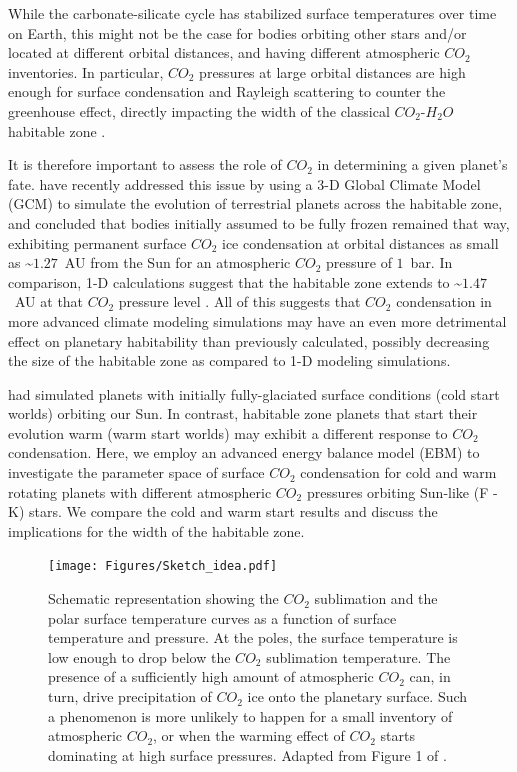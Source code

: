 \documentclass[fleqn,usenatbib]{mnras}
\providecommand{\DIFdelbegin}{} %
\providecommand{\DIFdelend}{} %
\newcommand{\DIFscaledelfig}{0.5}
\newlength{\DIFdelgraphicswidth} %
\newlength{\DIFdelgraphicsheight} %
\newcommand{\DIFdelincludegraphics}[2][]{%
\sbox{\DIFdelgraphicsbox}{\DIFOincludegraphics[#1]{#2}}%
\settoboxwidth{\DIFdelgraphicswidth}{\DIFdelgraphicsbox} %
\settoboxtotalheight{\DIFdelgraphicsheight}{\DIFdelgraphicsbox} %
\scalebox{\DIFscaledelfig}{%
\parbox[b]{\DIFdelgraphicswidth}{\usebox{\DIFdelgraphicsbox}\\[-\baselineskip] \rule{\DIFdelgraphicswidth}{0em}}\llap{\resizebox{\DIFdelgraphicswidth}{\DIFdelgraphicsheight}{%
\setlength{\unitlength}{\DIFdelgraphicswidth}%
\begin{picture}(1,1)%
\thicklines\linethickness{2pt} %
{\color[rgb]{1,0,0}\put(0,0){\framebox(1,1){}}}%
{\color[rgb]{1,0,0}\put(0,0){\line( 1,1){1}}}%
{\color[rgb]{1,0,0}\put(0,1){\line(1,-1){1}}}%
\end{picture}%
}\hspace*{3pt}}} %
} %
\DeclareRobustCommand{\DIFdelbegin}{\DIFOdelbegin \let\includegraphics\DIFdelincludegraphics} %
\DeclareRobustCommand{\DIFdelend}{\DIFOaddend \let\includegraphics\DIFOincludegraphics} %
\begin{document}
While the carbonate-silicate cycle has stabilized surface temperatures over time on Earth, this might not be the case for bodies orbiting other stars and/or located at different orbital distances, and having different atmospheric $CO_{\mathrm{2}}$ inventories. In particular, $CO_{\mathrm{2}}$ pressures at large orbital distances are high enough for surface condensation and Rayleigh scattering to counter the greenhouse effect, directly impacting the width of the classical $CO_{\mathrm{2}}$-$H_{\mathrm{2}}O$ habitable zone \citep{kasting1993,KumarKopparapu2013, Ramirez2018}. \DIFdelbegin %

\DIFdelend It is therefore important to assess the role of $CO_{\mathrm{2}}$ in determining a given planet's fate. \citet{Turbet2017} have recently addressed this issue by using a 3-D Global Climate Model (GCM) to simulate the evolution of terrestrial planets across the habitable zone, and concluded that bodies initially assumed to be fully frozen remained that way, exhibiting permanent surface $CO_{\mathrm{2}}$ ice condensation at orbital distances as small as \textasciitilde $1.27$~AU from the Sun for an atmospheric $CO_{\mathrm{2}}$ pressure of $1$~bar. In comparison, 1-D calculations suggest that the habitable zone extends to \textasciitilde $1.47$~AU at that $CO_{\mathrm{2}}$ pressure level \citep{kasting1993,KumarKopparapu2013, Ramirez2018}. 
All of this suggests that $CO_{\mathrm{2}}$ condensation in more advanced climate modeling simulations may have an even more detrimental effect on planetary habitability than previously calculated, possibly decreasing the size of the habitable zone as compared to 1-D modeling simulations.

\citet{Turbet2017} had simulated planets with initially fully-glaciated surface conditions (cold start worlds) orbiting our Sun. In contrast, habitable zone planets that start their evolution warm (warm start worlds) may exhibit a different response to $CO_{\mathrm{2}}$ condensation. Here, we employ an advanced energy balance model (EBM) to investigate the parameter space of surface $CO_{\mathrm{2}}$ condensation for cold and warm rotating planets with different atmospheric $CO_{\mathrm{2}}$ pressures orbiting Sun-like (F - K) stars. We compare the cold and warm start results and discuss the implications for the width of the habitable zone.

\begin{figure}
	\texttt{[image: Figures/Sketch\_idea.pdf]}
    \caption{Schematic representation showing the $CO_{\mathrm{2}}$ sublimation and the polar surface temperature curves as a function of surface temperature and pressure. At the poles, the surface temperature is low enough to drop below the $CO_{\mathrm{2}}$ sublimation temperature. The presence of a sufficiently high amount of atmospheric $CO_{\mathrm{2}}$ can, in turn, drive precipitation of $CO_{\mathrm{2}}$ ice onto the planetary surface. 
    Such a phenomenon is more unlikely to happen for a small inventory of atmospheric $CO_{\mathrm{2}}$, or when the warming effect of $CO_{\mathrm{2}}$ starts dominating at high surface pressures. Adapted from Figure 1 of \citet{Soto2015}.}
    \label{fig:Sketch}
\end{figure}
\end{document}
